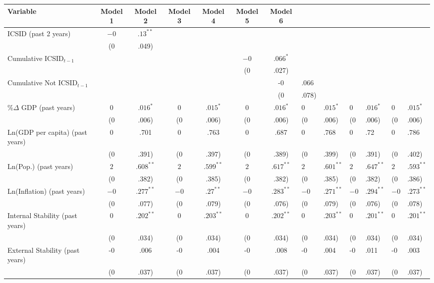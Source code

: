 \begin{table}[ht]
\centering
\begingroup\footnotesize
\begin{tabular}{lcccccc}
 Variable & Model 1 & Model 2 & Model 3 & Model 4 & Model 5 & Model 6 \\ 
  \hline
\hline
ICSID (past 2 years) & $-0$&$.13^{\ast\ast}$ &  &  &  &  &  \\ 
   & (0&.049) &  &  &  &  &  \\ 
  Cumulative ICSID$_{t-1}$ &  &  &  &  & $-0$&$.066^{\ast}$ &  \\ 
   &  &  &  &  & (0&.027) &  \\ 
  Cumulative Not ICSID$_{t-1}$ &  &  &  &  &  & -0&.066 \\ 
   &  &  &  &  &  & (0&.078) \\ 
  \%$\Delta$ GDP (past  years) & $0$&$.016^{\ast}$ & $0$&$.015^{\ast}$ & $0$&$.016^{\ast}$ & $0$&$.015^{\ast}$ & $0$&$.016^{\ast}$ & $0$&$.015^{\ast}$ \\ 
   & (0&.006) & (0&.006) & (0&.006) & (0&.006) & (0&.006) & (0&.006) \\ 
  Ln(GDP per capita) (past  years) & 0&.701 & 0&.763 & 0&.687 & 0&.768 & 0&.72 & 0&.786 \\ 
   & (0&.391) & (0&.397) & (0&.389) & (0&.399) & (0&.391) & (0&.402) \\ 
  Ln(Pop.) (past  years) & $2$&$.608^{\ast\ast}$ & $2$&$.599^{\ast\ast}$ & $2$&$.617^{\ast\ast}$ & $2$&$.601^{\ast\ast}$ & $2$&$.647^{\ast\ast}$ & $2$&$.593^{\ast\ast}$ \\ 
   & (0&.382) & (0&.385) & (0&.382) & (0&.385) & (0&.382) & (0&.386) \\ 
  Ln(Inflation) (past  years) & $-0$&$.277^{\ast\ast}$ & $-0$&$.27^{\ast\ast}$ & $-0$&$.283^{\ast\ast}$ & $-0$&$.271^{\ast\ast}$ & $-0$&$.294^{\ast\ast}$ & $-0$&$.273^{\ast\ast}$ \\ 
   & (0&.077) & (0&.079) & (0&.076) & (0&.079) & (0&.076) & (0&.078) \\ 
  Internal Stability (past  years) & $0$&$.202^{\ast\ast}$ & $0$&$.203^{\ast\ast}$ & $0$&$.202^{\ast\ast}$ & $0$&$.203^{\ast\ast}$ & $0$&$.201^{\ast\ast}$ & $0$&$.201^{\ast\ast}$ \\ 
   & (0&.034) & (0&.034) & (0&.034) & (0&.034) & (0&.034) & (0&.034) \\ 
  External Stability (past  years) & -0&.006 & -0&.004 & -0&.008 & -0&.004 & -0&.011 & -0&.003 \\ 
   & (0&.037) & (0&.037) & (0&.037) & (0&.037) & (0&.037) & (0&.037) \\ 

\end{tabular}
\end{table}
